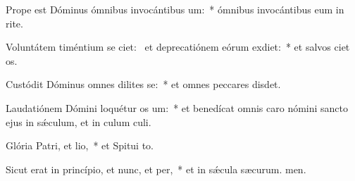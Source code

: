 \item Prope est Dóminus ómnibus invocántibus um:~* ómnibus invocántibus eum in rite.
\item Voluntátem timéntium se ciet:~\pscross{} et deprecatiónem eórum exdiet:~* et salvos ciet os.
\item Custódit Dóminus omnes dilites se:~* et omnes peccares disdet.
\item Laudatiónem Dómini loquétur os um:~* et benedícat omnis caro nómini sancto ejus in sǽculum, et in culum culi.
\item Glória Patri, et lio,~* et Spitui to.
\item Sicut erat in princípio, et nunc, et per,~* et in sǽcula sæcurum. men.

